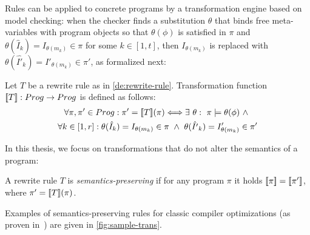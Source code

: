 Rules can be applied to concrete programs by a transformation engine based on model checking: when the checker finds a substitution $\theta$ that binds free meta-variables with program objects so that $\theta(\phi)$ is satisfied in $\pi$ and $\theta(\hat{I}_k)=I_{\theta(m_k)}\in \pi$ for some $k\in[1,t]$, then $I_{\theta(m_k)}$ is replaced with $\theta(\hat{I'}_k)=I'_{\theta(m_k)}\in \pi'$, as formalized next:

\begin{definition}
\label{de:trans-func}
Let $T$ be a rewrite rule as in \ref{de:rewrite-rule}. Transformation function $[\![T]\!]: Prog\rightarrow Prog$ is defined as follows:
\vspace{-2mm}
\begin{multline*}
\forall \pi, \pi'\in Prog: \pi'=[\![T]\!](\pi) \Longleftrightarrow
\exists ~ \theta: ~ \pi\models \theta(\phi) ~ \wedge ~ \\
\forall k\in[1,r]: \theta(\hat{I}_k)=I_{\theta(m_k)}\in \pi ~ \wedge ~ \theta(\hat{I'}_k)=I'_{\theta(m_k)}\in \pi'
\end{multline*}
\end{definition}

\noindent In this thesis, we focus on transformations that do not alter the semantics of a program:

\begin{definition}
\label{de:sound-trans}
A rewrite rule $T$ is {\em semantics-preserving} if for any program $\pi$ it holds $[\![\pi]\!]=[\![\pi']\!]$, where $\pi'=[\![T]\!](\pi)$.
\end{definition}

\noindent Examples of semantics-preserving rules for classic compiler optimizations (as proven in~\cite{Lacey02,Lacey04}) are given in \myfigure\ref{fig:sample-trans}.


